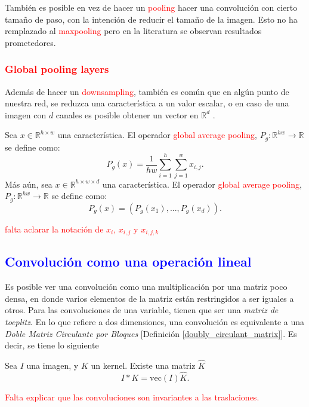También es posible en vez de hacer un \textcolor{red}{pooling} hacer una convolución con cierto tamaño de paso, con la intención de reducir el tamaño de la imagen. Esto no ha remplazado al \textcolor{red}{maxpooling} pero en la literatura se observan resultados prometedores. 
\subsubsection{\textcolor{red}{Global pooling layers} }
Además de hacer un \textcolor{red}{downsampling}, también es común que en algún punto de nuestra red, se reduzca una característica a un valor escalar, o en caso de una imagen con $d$ canales es posible obtener un vector en $\mathbb R^d$ \cite{CNNdefinition}.
\begin{definition}
    Sea $x\in \mathbb R^{h\times w}$ una característica. El operador \textcolor{red}{global average pooling}, $P_g: \mathbb R^{hw}\to \mathbb R$ se define como:
    \begin{equation}
        P_g(x) = \frac{1}{hw}\sum_{i=1}^h\sum_{j=1}^w x_{i,j}.
    \end{equation}
    Más aún, sea $x \in \mathbb R^{h\times w \times d}$ una característica. El operador \textcolor{red}{global average pooling}, $P_g: \mathbb R^{hw}\to \mathbb R$ se define como:
    \begin{equation}
        P_g(x) = (P_g(x_1), ..., P_g(x_d)).
    \end{equation}
\end{definition}
\textcolor{red}{falta aclarar la notación de $x_i$, $x_{i,j}$ y $x_{i,j,k}$}
\subsection{\textcolor{blue}{Convolución como una operación lineal}}
 Es posible ver una convolución como una multiplicación por una matriz poco densa, en donde varios elementos de la matriz están restringidos a ser iguales a otros. Para las convoluciones de una variable, tienen que ser una \textsl{matriz de toeplitz}. En lo que refiere a dos dimensiones, una convolución es equivalente a una \textsl{Doble Matriz Circulante por Bloques} [Definición \ref{doubly_circulant_matrix}]. Es decir, se tiene lo siguiente 
 \begin{corollary}
    Sea $I$ una imagen, y $K$ un kernel. Existe una matriz $\hat K$ 
    \begin{equation}
        I*K = \text{vec}(I)\hat K.
    \end{equation}
 \end{corollary}
 \textcolor{red}{Falta explicar que las convoluciones son invariantes a las traslaciones.}


